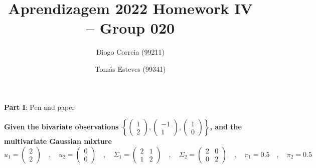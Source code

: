 \documentclass[12pt]{article}
\title{\large{Aprendizagem 2022}\vskip 0.2cm Homework IV -- Group 020}
\date{}
\author{Diogo Correia (99211) \and Tomás Esteves (99341)}
\begin{document}
\maketitle
\begin{center}
    \large{\vskip -1.0cm\textbf{Part I}: Pen and paper}
\end{center}

{
\color{questioncolor}\bfseries
\noindent
Given the bivariate observations $
    \left\{
    \begin{pmatrix}
        1 \\
        2
    \end{pmatrix},
    \begin{pmatrix}
        -1 \\
        1
    \end{pmatrix},
    \begin{pmatrix}
        1 \\
        0
    \end{pmatrix}
    \right\}
$, and the multivariate Gaussian mixture
$$
    u_1 = \begin{pmatrix}
        2 \\
        2
    \end{pmatrix}
    \quad,\quad
    u_2 = \begin{pmatrix}
        0 \\
        0
    \end{pmatrix}
    \quad,\quad
    \varSigma_1 = \begin{pmatrix}
        2 & 1 \\
        1 & 2
    \end{pmatrix}
    \quad,\quad
    \varSigma_2 = \begin{pmatrix}
        2 & 0 \\
        0 & 2
    \end{pmatrix}
    \quad,\quad
    \pi_1 = 0.5
    \quad,\quad
    \pi_2 = 0.5
$$
}
\end{document}
